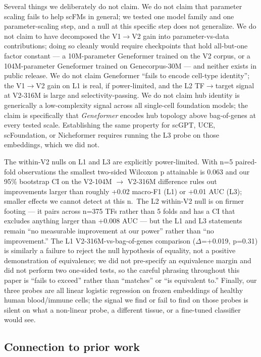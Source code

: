 \documentclass[10pt]{article}
\begin{document}
Several things we deliberately do not claim. We do not claim that
parameter scaling fails to help scFMs in general; we tested one model
family and one parameter-scaling step, and a null at this specific step
does not generalize. We do not claim to have decomposed the V1$\to$V2 gain
into parameter-vs-data contributions; doing so cleanly would require
checkpoints that hold all-but-one factor constant --- a 10M-parameter
Geneformer trained on the V2 corpus, or a 104M-parameter Geneformer
trained on Genecorpus-30M --- and neither exists in public release. We
do not claim Geneformer ``fails to encode cell-type identity''; the
V1$\to$V2 gain on L1 is real, if power-limited, and the L2 TF$\to$target signal
at V2-316M is large and selectivity-passing. We do not claim hub
identity is generically a low-complexity signal across all single-cell
foundation models; the claim is specifically that \emph{Geneformer}
encodes hub topology above bag-of-genes at every tested scale.
Establishing the same property for scGPT, UCE, scFoundation, or
Nicheformer requires running the L3 probe on those embeddings, which we
did not.

The within-V2 nulls on L1 and L3 are explicitly power-limited. With n=5
paired-fold observations the smallest two-sided Wilcoxon p attainable is
0.063 and our 95\% bootstrap CI on the V2-104M $\to$ V2-316M difference
rules out improvements larger than roughly +0.02 macro-F1 (L1) or +0.01
AUC (L3); smaller effects we cannot detect at this n.~The L2 within-V2
null is on firmer footing --- it pairs across n=375 TFs rather than 5
folds and has a CI that excludes anything larger than +0.008 AUC --- but
the L1 and L3 statements remain ``no measurable improvement at our
power'' rather than ``no improvement.'' The L1 V2-316M-vs-bag-of-genes
comparison ($\Delta$=+0.019, p=0.31) is similarly a failure to reject the null
hypothesis of equality, not a positive demonstration of equivalence; we
did not pre-specify an equivalence margin and did not perform two
one-sided tests, so the careful phrasing throughout this paper is
``fails to exceed'' rather than ``matches'' or ``is equivalent to.''
Finally, our three probes are all linear logistic regression on frozen
embeddings of healthy human blood/immune cells; the signal we find or
fail to find on those probes is silent on what a non-linear probe, a
different tissue, or a fine-tuned classifier would see.

\subsection{Connection to prior
work}\label{connection-to-prior-work}
\end{document}
